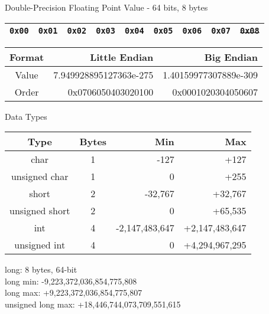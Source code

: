 \documentclass{beamer}
\begin{document}
\begin{frame}{Double-Precision Floating Point Value - 64 bits, 8 bytes}

\begin{table}[]
\begin{tabular}{|l|l|l|l|l|l|l|l|l|}
\hline
 \color{red}\texttt{0x00} & \color{red}\texttt{0x01} & \color{red}\texttt{0x02} & \color{red}\texttt{0x03} & \color{red}\texttt{0x04} & \color{red}\texttt{0x05} & \color{red}\texttt{0x06} & \color{red}\texttt{0x07} &
 \sout{\texttt{0x08}} \\
\hline 
\end{tabular}
\end{table}

\begin{table}[]
\begin{tabular}{c r r}
Format & Little Endian & Big Endian \\
\hline
Value &  7.949928895127363e-275   & 1.40159977307889e-309 \\
Order & 0x0706050403020100 & 0x0001020304050607
\end{tabular}
\end{table}

\end{frame}

\begin{frame}{Data Types}
\begin{table}[]
\begin{tabular}{c c r r}
Type & Bytes & Min & Max \\
\hline
char & 1 & -127 & +127 \\
unsigned char & 1 & 0 & +255 \\
short & 2 & -32,767 & +32,767   \\
unsigned short & 2 & 0 & +65,535 \\
int & 4 & -2,147,483,647 & +2,147,483,647 \\
unsigned int & 4 & 0 & +4,294,967,295
\end{tabular}
\end{table}
long: 8 bytes, 64-bit \\
long min: -9,223,372,036,854,775,808 \\
long max: +9,223,372,036,854,775,807 \\
unsigned long max: +18,446,744,073,709,551,615
\end{frame}
\end{document}
